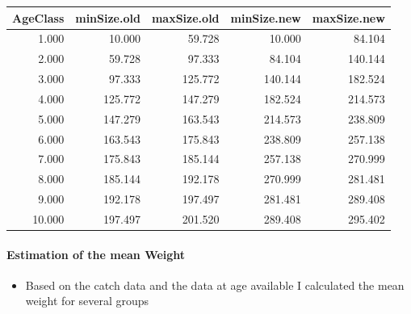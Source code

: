 \documentclass[11pt]{article}
\begin{document}
\begin{itemize}
\begin{center}
\begin{tabular}{rrrrr}
 AgeClass  &  minSize.old  &  maxSize.old  &  minSize.new  &  maxSize.new  \\
\hline
    1.000  &       10.000  &       59.728  &       10.000  &       84.104  \\
    2.000  &       59.728  &       97.333  &       84.104  &      140.144  \\
    3.000  &       97.333  &      125.772  &      140.144  &      182.524  \\
    4.000  &      125.772  &      147.279  &      182.524  &      214.573  \\
    5.000  &      147.279  &      163.543  &      214.573  &      238.809  \\
    6.000  &      163.543  &      175.843  &      238.809  &      257.138  \\
    7.000  &      175.843  &      185.144  &      257.138  &      270.999  \\
    8.000  &      185.144  &      192.178  &      270.999  &      281.481  \\
    9.000  &      192.178  &      197.497  &      281.481  &      289.408  \\
   10.000  &      197.497  &      201.520  &      289.408  &      295.402  \\
\end{tabular}
\end{center}



\end{itemize} %
\paragraph*{Estimation of the mean Weight}
\label{sec-5-2-1-12}

\begin{itemize}
\item Based on the catch data and the data at age available I calculated the mean weight for several groups
\end{itemize}
\end{document}
